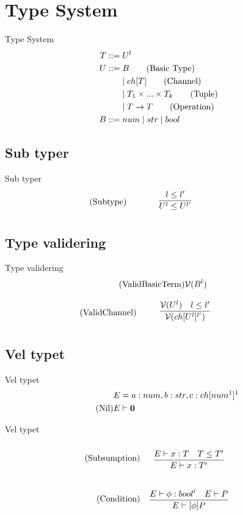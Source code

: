 \section{Type System}
\begin{frame}{Type System}
    \begin{align*}
        T::=&\;U^l\\    	
        U::=&\;B \tag{Basic Type}\\
        &\mid ch[T] \tag{Channel}\\
        &\mid T_1 \times...\times T_k \tag{Tuple}\\
        &\mid T\rightarrow T \tag{Operation}\\
        B::=&\;num 
        \mid str
        \mid bool\\
    \end{align*}
\end{frame}

\subsection{Sub typer}
\begin{frame}{Sub typer}
    \begin{align*}
       \tag{Subtype}\label{rule:Subtype} &\infrule{l\leq l'}{U^l\leq U^{l'}}
    \end{align*}
\end{frame}

\subsection{Type validering}
\begin{frame}{Type validering}
    \begin{align*}
        \tag{ValidBasicTerm}\label{rule:ValidBasicTerm} &\mathcal{V}(B^l)
    \end{align*}

    \begin{align*}
        \tag{ValidChannel}\label{rule:ValidChannel} &\infrule{\valid{U^l}\quad l\leq l'}{\valid{ch[U^l]^{l'}}}
    \end{align*}
\end{frame}

\subsection{Vel typet}
\begin{frame}{Vel typet}
    \begin{align*}
        &E=a:num, b:str, c:ch[num^1]^1\\
        \tag{Nil}\label{rule:Nil} &E \vdash \mathbf{0}
    \end{align*}
\end{frame}

\begin{frame}{Vel typet}
    \begin{align*}
        \tag{Subsumption}\label{rule:subsumption} &\infrule{E\vdash x:T\quad T\leq T'}{E\vdash x:T'}\\
        \tag{Condition}\label{rule:Condition} &\infrule{E\vdash \phi:bool^l\quad E\vdash P}{E \vdash [\phi] P}
    \end{align*}
\end{frame}
